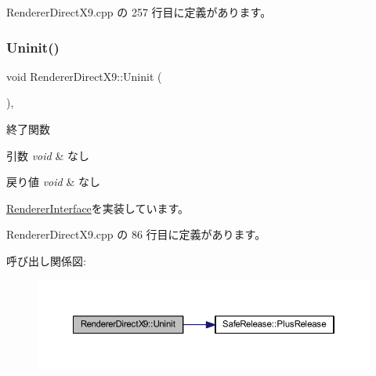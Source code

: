  Renderer\+Direct\+X9.\+cpp の 257 行目に定義があります。

\mbox{\label{class_renderer_direct_x9_af7ff314cbaa894d71e37c10565002f8f}} 
\subsubsection{\texorpdfstring{Uninit()}{Uninit()}}
{\footnotesize\ttfamily void Renderer\+Direct\+X9\+::\+Uninit (\begin{DoxyParamCaption}{ }\end{DoxyParamCaption})\hspace{0.3cm}{\ttfamily [override]}, {\ttfamily [virtual]}}



終了関数 


\begin{DoxyParams}{引数}
{\em void} & なし \\
\hline
\end{DoxyParams}

\begin{DoxyRetVals}{戻り値}
{\em void} & なし \\
\hline
\end{DoxyRetVals}


\mbox{\hyperlink{class_renderer_interface_ada105489f9db98e7e9542b278699d558}{Renderer\+Interface}}を実装しています。



 Renderer\+Direct\+X9.\+cpp の 86 行目に定義があります。

呼び出し関係図\+:
\nopagebreak
\begin{figure}[H]
\begin{center}
\leavevmode
\includegraphics[width=350pt]{class_renderer_direct_x9_af7ff314cbaa894d71e37c10565002f8f_cgraph}
\end{center}
\end{figure}
\mbox{\label{class_renderer_direct_x9_aa555dda63bdc0f4dfc28ac506d6e8d60}} 
